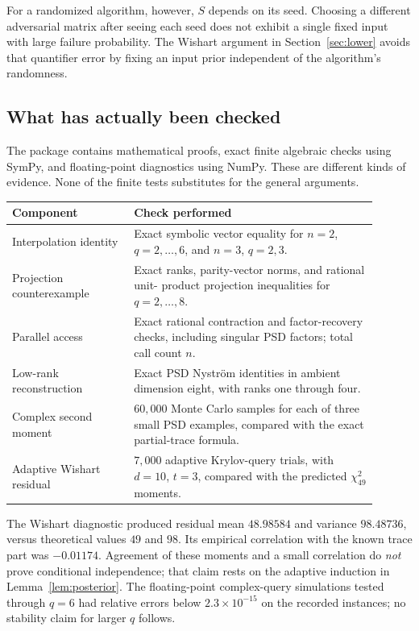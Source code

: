 \documentclass[11pt]{article}
\theoremstyle{definition}\newtheorem{definition}[theorem]{Definition}
\theoremstyle{remark}\newtheorem{remark}[theorem]{Remark}
\begin{document}
For a randomized algorithm, however, $S$ depends on its seed. Choosing a
different adversarial matrix after seeing each seed does not exhibit a single
fixed input with large failure probability. The Wishart argument in
Section~\ref{sec:lower} avoids that quantifier error by fixing an input prior
independent of the algorithm's randomness.

\subsection{What has actually been checked}
The package contains mathematical proofs, exact finite algebraic checks using
SymPy, and floating-point diagnostics using NumPy. These are different kinds
of evidence. None of the finite tests substitutes for the general arguments.

\begin{center}
\begin{tabular}{p{0.30\linewidth}p{0.60\linewidth}}
\toprule
Component & Check performed\\
\midrule
Interpolation identity & Exact symbolic vector equality for $n=2$, $q=2,\ldots,6$,
 and $n=3$, $q=2,3$.\\
Projection counterexample & Exact ranks, parity-vector norms, and rational unit-
 product projection inequalities for $q=2,\ldots,8$.\\
Parallel access & Exact rational contraction and factor-recovery checks, including
 singular PSD factors; total call count $n$.\\
Low-rank reconstruction & Exact PSD Nystr\"om identities in ambient dimension eight,
 with ranks one through four.\\
Complex second moment & $60{,}000$ Monte Carlo samples for each of three small PSD
 examples, compared with the exact partial-trace formula.\\
Adaptive Wishart residual & $7{,}000$ adaptive Krylov-query trials, with $d=10$, $t=3$,
 compared with the predicted $\chi^2_{49}$ moments.\\
\bottomrule
\end{tabular}
\end{center}

The Wishart diagnostic produced residual mean $48.98584$ and variance
$98.48736$, versus theoretical values $49$ and $98$. Its empirical correlation
with the known trace part was $-0.01174$. Agreement of these moments and a small
correlation do \emph{not} prove conditional independence; that claim rests on
the adaptive induction in Lemma~\ref{lem:posterior}.
The floating-point complex-query simulations tested through $q=6$ had relative
errors below $2.3\times10^{-15}$ on the recorded instances; no stability claim
for larger $q$ follows.
\end{document}
